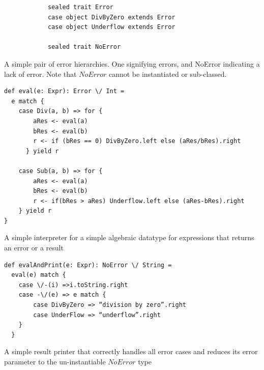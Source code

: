 \documentclass[12pt,a4paper,twoside,openright]{report}
\renewcommand{\baselinestretch}{1.1}    %
\begin{document}
\renewcommand{\baselinestretch}{0.8}
\begin{framed}
	\begin{framed}
		\begin{verbatim}
			sealed trait Error
			case object DivByZero extends Error
			case object Underflow extends Error

			sealed trait NoError
		\end{verbatim}
	\end{framed}
	
	A simple pair of error hierarchies. One signifying errors, and NoError indicating a lack of error. Note that $NoError$ cannot be instantiated or sub-classed.


	\begin{framed}
		\begin{verbatim}
def eval(e: Expr): Error \/ Int = 
  e match {
    case Div(a, b) => for {
        aRes <- eval(a)
        bRes <- eval(b)
        r <- if (bRes == 0) DivByZero.left else (aRes/bRes).right
      } yield r

    case Sub(a, b) => for {
        aRes <- eval(a)
        bRes <- eval(b)
        r <- if(bRes > aRes) Underflow.left else (aRes-bRes).right
    } yield r
}
		\end{verbatim}
	\end{framed}
\renewcommand{\baselinestretch}{1.1}
	
	A simple interpreter for a simple algebraic datatype for expressions that returns an error or a result
	
\renewcommand{\baselinestretch}{0.8}
	\begin{framed}
		\begin{verbatim}
def evalAndPrint(e: Expr): NoError \/ String = 
  eval(e) match {
    case \/-(i) =>i.toString.right
    case -\/(e) => e match {
        case DivByZero => “division by zero”.right
        case UnderFlow => “underflow”.right
    }
  }
		\end{verbatim}
	\end{framed}
\renewcommand{\baselinestretch}{1.1}

	A simple result printer that correctly handles all error cases and reduces its error parameter to the un-instantiable $NoError$ type
		
\end{framed}
\end{document}
